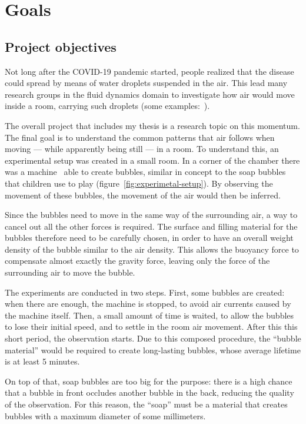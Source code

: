 \chapter{Goals}
\label{chap:goal}

\section{Project objectives}

Not long after the COVID-19 pandemic started, people realized that the disease could spread by means of water droplets suspended in the air.
This lead many research groups in the fluid dynamics domain to investigate how air would move inside a room, carrying such droplets (some examples:~\cite{covid-air-1}\cite{covid-air-2}).

The overall project that includes my thesis is a research topic on this momentum.
The final goal is to understand the common patterns that air follows when moving --- while apparently being still --- in a room.
To understand this, an experimental setup was created in a small room.
In a corner of the chamber there was a machine~\cite{bubble-machine} able to create bubbles, similar in concept to the soap bubbles that children use to play (figure~\ref{fig:experimetal-setup}). By observing the movement of these bubbles, the movement of the air would then be inferred.

Since the bubbles need to move in the same way of the surrounding air, a way to cancel out all the other forces is required.
The surface and filling material for the bubbles therefore need to be carefully chosen, in order to have an overall weight density of the bubble similar to the air density.
This allows the buoyancy force to compensate almost exactly the gravity force, leaving only the force of the surrounding air to move the bubble.

The experiments are conducted in two steps.
First, some bubbles are created: when there are enough, the machine is stopped, to avoid air currents caused by the machine itself.
Then, a small amount of time is waited, to allow the bubbles to lose their initial speed, and to settle in the room air movement.
After this this short period, the observation starts.
Due to this composed procedure, the ``bubble material'' would be required to create long-lasting bubbles, whose average lifetime is at least 5 minutes.

On top of that, soap bubbles are too big for the purpose: there is a high chance that a bubble in front occludes another bubble in the back, reducing the quality of the observation.
For this reason, the ``soap'' must be a material that creates bubbles with a maximum diameter of some millimeters.

